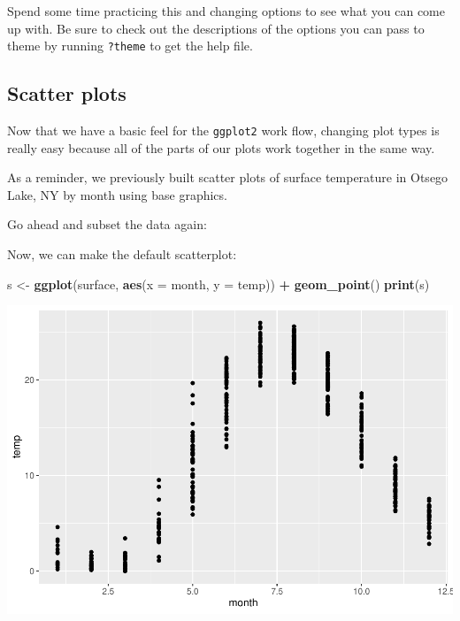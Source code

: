 \documentclass[
]{book}
\newenvironment{Shaded}{\begin{snugshade}}{\end{snugshade}}
\newcommand{\DataTypeTok}[1]{\textcolor[rgb]{0.13,0.29,0.53}{#1}}
\newcommand{\FloatTok}[1]{\textcolor[rgb]{0.00,0.00,0.81}{#1}}
\newcommand{\KeywordTok}[1]{\textcolor[rgb]{0.13,0.29,0.53}{\textbf{#1}}}
\newcommand{\NormalTok}[1]{#1}
\newcommand{\OperatorTok}[1]{\textcolor[rgb]{0.81,0.36,0.00}{\textbf{#1}}}
\newcommand{\StringTok}[1]{\textcolor[rgb]{0.31,0.60,0.02}{#1}}
\begin{document}
Spend some time practicing this and changing options to see what you can come up with. Be sure to check out the descriptions of the options you can pass to theme by running \texttt{?theme} to get the help file.

\hypertarget{ggscatter}{%
\subsection{Scatter plots}\label{ggscatter}}

Now that we have a basic feel for the \texttt{ggplot2} work flow, changing plot types is really easy because all of the parts of our plots work together in the same way.

As a reminder, we previously built scatter plots of surface temperature in Otsego Lake, NY by month using base graphics.

Go ahead and subset the data again:

\begin{Shaded}
\end{Shaded}

Now, we can make the default scatterplot:

\begin{Shaded}
\begin{Highlighting}[]
\NormalTok{s <-}\StringTok{ }\KeywordTok{ggplot}\NormalTok{(surface, }\KeywordTok{aes}\NormalTok{(}\DataTypeTok{x =}\NormalTok{ month, }\DataTypeTok{y =}\NormalTok{ temp)) }\OperatorTok{+}
\StringTok{  }\KeywordTok{geom_point}\NormalTok{()}
\KeywordTok{print}\NormalTok{(s)}
\end{Highlighting}
\end{Shaded}

\includegraphics{worstr_files/figure-latex/unnamed-chunk-104-1.pdf}
\end{document}
